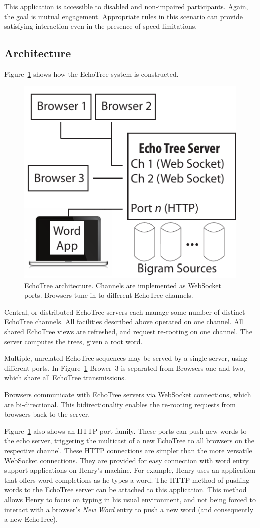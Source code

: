 \documentclass{sigchi}
\begin{document}
This application is accessible to disabled and non-impaired
participants. Again, the goal is mutual engagement. Appropriate rules
in this scenario can provide satisfying interaction even in the
presence of speed limitations.

\subsection{Architecture}
Figure~\ref{fig:arch} shows how the EchoTree system is
constructed. 
\begin{figure}
   \centering
   \includegraphics[width=0.5\columnwidth]{Figs/echoTreeArch.pdf}
   \caption{EchoTree architecture. Channels are implemented as
     WebSocket ports. Browsers tune in to different EchoTree channels.}
   \label{fig:arch}
\end{figure}
Central, or distributed EchoTree servers each manage some
number of distinct EchoTree channels. All facilities described above
operated on one channel. All shared EchoTree views are refreshed, and
request re-rooting on one channel. The server computes the trees,
given a root word.

Multiple, unrelated EchoTree sequences may be served by a single
server, using different ports. In Figure~\ref{fig:arch}
Brower~3 is separated from Browsers one and two, which share all
EchoTree transmissions.

Browsers communicate with EchoTree servers via WebSocket connections,
which are bi-directional. This bidirectionality enables the re-rooting
requests from browsers back to the server.

Figure~\ref{fig:arch} also shows an HTTP port family. These ports can
push new words to the echo server, triggering the multicast of a new
EchoTree to all browsers on the respective channel. These HTTP
connections are simpler than the more versatile WebSocket
connections. They are provided for easy connection with word entry
support applications on Henry's machine. For example, Henry uses an
application that offers word completions as he types a word. The HTTP
method of pushing words to the EchoTree server can be attached to this
application. This method allows Henry to focus on typing in his usual
environment, and not being forced to interact with a browser's {\em
  New Word} entry to push a new word (and consequently a new
EchoTree).
\end{document}
